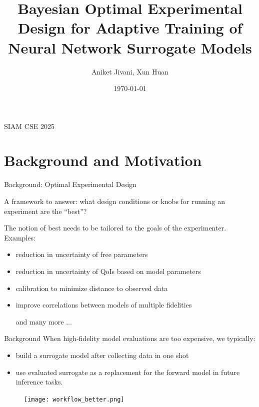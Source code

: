 \documentclass[usenames,dvipsnames,aspectratio=169]{beamer}
\title[Seminar]{Bayesian Optimal Experimental Design for Adaptive Training of Neural Network Surrogate Models}
\author[AJ]{Aniket Jivani, Xun Huan}
\institute[U-M]{University of Michigan}
\date{\today}
\theoremstyle{definition}
\begin{document}
\begin{frame}
\titlepage %
\vspace{}
\center SIAM CSE 2025
\end{frame}




     


\section[Background]{Background and Motivation}
\begin{frame}{Background: Optimal Experimental Design}

A framework to answer: what design conditions or knobs for running an experiment are the “best”?
   
The notion of best needs to be tailored to the goals of the experimenter. Examples:

\begin{itemize}

\item reduction in uncertainty of free parameters



\item reduction in uncertainty of QoIs based on model parameters

\pause

\item calibration to minimize distance to observed data

\item improve correlations between models of multiple fidelities

and many more $\ldots$
\end{itemize}



\end{frame}


\begin{frame}{Background}
When high-fidelity model evaluations are too expensive, we typically:

\begin{itemize}
    \item build a surrogate model after collecting data in one shot
    
    \item use evaluated surrogate as a replacement for the forward model in future inference tasks.
\end{itemize}

\begin{figure}
    \centering
    \texttt{[image: workflow\_better.png]}
\end{figure}


\end{frame}
\end{document}
